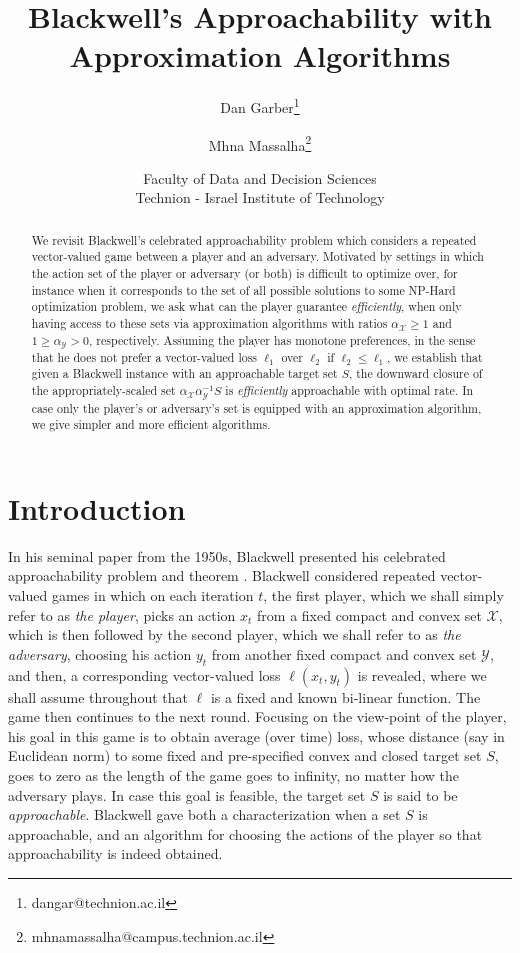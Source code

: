 \documentclass[a4paper,12pt]{article}
\newcommand{\mY}{\mathcal{Y}}
\newcommand{\mX}{\mathcal{X}}
\begin{document}
\title{Blackwell's Approachability with Approximation Algorithms}
\author{Dan Garber\footnote{dangar@technion.ac.il} 
\and
Mhna Massalha\footnote{mhnamassalha@campus.technion.ac.il} \\ 
}
\date{Faculty of Data and Decision Sciences  \vspace{5pt} \\ Technion - Israel Institute of Technology}
\maketitle

\begin{abstract}
We revisit Blackwell's celebrated approachability problem which considers a repeated vector-valued game between a player and an adversary. Motivated by settings in which the action set of the player or adversary (or both) is difficult to optimize over, for instance when it corresponds to the set of all possible solutions to some NP-Hard optimization problem, we ask what can the player guarantee \textit{efficiently}, when only having access to these sets via approximation algorithms with ratios $\alpha_{\mX} \geq 1$ and $ 1 \geq \alpha_{\mY} > 0$, respectively. Assuming the player has monotone preferences, in the sense that he does not prefer a vector-valued loss $\ell_1$ over $\ell_2$ if $\ell_2 \leq \ell_1$, we establish that given a Blackwell instance with an approachable target set $S$,  the downward closure of the appropriately-scaled set $\alpha_{\mX}\alpha_{\mY}^{-1}S$ is \textit{efficiently} approachable with optimal rate. In case only the player's or adversary's set is equipped with an approximation algorithm, we give simpler and more efficient algorithms.
\end{abstract}

\section{Introduction}
In his seminal paper from the 1950s, Blackwell presented his celebrated approachability problem and theorem \cite{blackwell1956analog}. Blackwell considered repeated vector-valued games in which on each iteration $t$, the first player, which we shall simply refer to as \textit{the player}, picks an action $x_t$ from a fixed compact and convex set $\mX$, which is then followed by the second player, which we shall refer to as \textit{the adversary}, choosing his action $y_t$ from another fixed compact and convex set $\mY$, and then, a corresponding vector-valued loss $\ell(x_t,y_t)$ is revealed, where we shall assume throughout that $\ell$ is a fixed and known bi-linear function. The game then continues to the next round. Focusing on the view-point of the player, his goal in this game is to obtain average (over time) loss, whose distance (say in Euclidean norm) to some fixed and pre-specified convex and closed target set $S$, goes to zero as the length of the game goes to infinity, no matter how the adversary plays. In case this goal is feasible, the target set $S$ is said to be \textit{approachable}. Blackwell gave both a characterization when a set $S$ is approachable, and an algorithm for choosing the actions of the player so that approachability is indeed obtained. 
\end{document}
